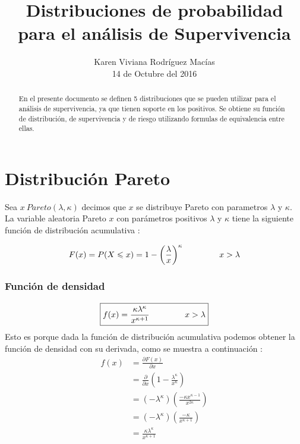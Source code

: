 \documentclass[10pt,a4paper]{article}
\title{Distribuciones de probabilidad \\ 
		\large \vspace*{-10pt} para el an\'alisis de Supervivencia\vspace*{10pt}}
\author{%
	Karen Viviana Rodr\'iguez Mac\'ias \\
	14 de Octubre del 2016 \\
	\vspace{20pt}
	}
\makeatletter
\def\printtitle{%
    {\color{bl} \centering \huge \sc \textbf{\@title}\par}}		%
\def\printauthor{%
    {\centering \small \@author}}				%
\makeatother
\begin{document}
\printtitle 

\printauthor

\begin{abstract}
En el presente documento se definen 5 distribuciones que se pueden utilizar para el análisis de supervivencia, ya que tienen soporte en los positivos. Se obtiene su función de distribución, de supervivencia y de riesgo utilizando formulas de equivalencia entre ellas.
\end{abstract}

\section{Distribuci\'on Pareto}
Sea $ x ~ Pareto(\lambda,\kappa) $ decimos que $x$ se distribuye Pareto con parametros $\lambda$ y $\kappa$. La variable aleatoria Pareto $x$ con parámetros positivos $\lambda$ y $\kappa$ tiene la siguiente función de distribución acumulativa :

\begin{equation*}
	F(x) = P(X \leqslant x) = 1 -  \left( \frac{\lambda}{x} \right) ^ \kappa \hspace{1.5cm} x>\lambda
\end{equation*}

\subsubsection*{Funci\'on de densidad}

\begin{equation*}
\boxed{
f(x) = \frac{\kappa \lambda ^ \kappa}{ x^{\kappa+1}} \hspace{1.5cm} x > \lambda}
\end{equation*}
Esto es porque dada la función de distribución acumulativa podemos obtener la función de densidad con su derivada, como se muestra a continuación : 
\begin{align*}
f(x) &= \frac{\partial F(x)}{\partial x}	 \\
	&=	\frac{\partial}{\partial x} \left(1 - \frac{\lambda ^ \kappa}{x ^ \kappa} \right)\\
	&= (-\lambda ^ \kappa) \left( \frac{-\kappa x^{\kappa-1}}{x^{2\kappa}} \right) \\
	&= (-\lambda ^ \kappa) \left( \frac{-\kappa}{x^{\kappa+1}} \right)\\
	&= \frac{\kappa \lambda^\kappa}{x^{\kappa+1}}
\end{align*} 
\end{document}
